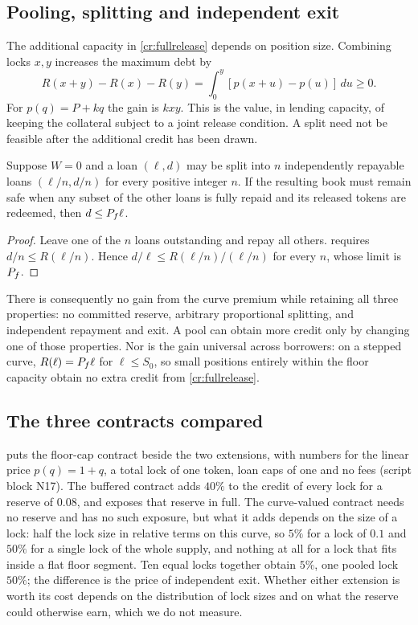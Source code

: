 \subsection{Pooling, splitting and independent exit}\label{cr:pooling}

The additional capacity in \eqref{cr:fullrelease} depends on position size. Combining locks $x,y$ increases the maximum debt by
\begin{equation}\label{cr:poolgain}
R(x+y)-R(x)-R(y)
=\int_0^y[p(x+u)-p(u)]\,du\ge0.
\end{equation}
For $p(q)=P+kq$ the gain is $kxy$. This is the value, in lending capacity, of keeping the collateral subject to a joint release condition. A split need not be feasible after the additional credit has been drawn.

\begin{proposition}\label{cr:splitting}
Suppose $W=0$ and a loan $(\ell,d)$ may be split into $n$ independently repayable loans $(\ell/n,d/n)$ for every positive integer $n$. If the resulting book must remain safe when any subset of the other loans is fully repaid and its released tokens are redeemed, then $d\le P_f\ell$.
\end{proposition}
\begin{proof}
Leave one of the $n$ loans outstanding and repay all others.  requires $d/n\le R(\ell/n)$. Hence $d/\ell\le R(\ell/n)/(\ell/n)$ for every $n$, whose limit is $P_f$.
\end{proof}

There is consequently no gain from the curve premium while retaining all three properties: no committed reserve, arbitrary proportional splitting, and independent repayment and exit. A pool can obtain more credit only by changing one of those properties. Nor is the gain universal across borrowers: on a stepped curve, $R(\ell)=P_f\ell$ for $\ell\le S_0$, so small positions entirely within the floor capacity obtain no extra credit from \eqref{cr:fullrelease}.

\subsection{The three contracts compared}\label{cr:compare}

 puts the floor-cap contract beside the two extensions, with numbers for the linear price $p(q)=1+q$, a total lock of one token, loan caps of one and no fees (script block N17). The buffered contract adds $40\%$ to the credit of every lock for a reserve of $0.08$, and exposes that reserve in full. The curve-valued contract needs no reserve and has no such exposure, but what it adds depends on the size of a lock: half the lock size in relative terms on this curve, so $5\%$ for a lock of $0.1$ and $50\%$ for a single lock of the whole supply, and nothing at all for a lock that fits inside a flat floor segment. Ten equal locks together obtain $5\%$, one pooled lock $50\%$; the difference is the price of independent exit. Whether either extension is worth its cost depends on the distribution of lock sizes and on what the reserve could otherwise earn, which we do not measure.


